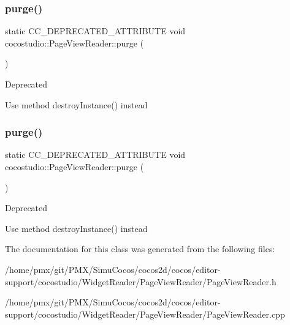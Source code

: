 \subsubsection{\texorpdfstring{purge()}{purge()}\hspace{0.1cm}{\footnotesize\ttfamily [1/2]}}
{\footnotesize\ttfamily static C\+C\+\_\+\+D\+E\+P\+R\+E\+C\+A\+T\+E\+D\+\_\+\+A\+T\+T\+R\+I\+B\+U\+TE void cocostudio\+::\+Page\+View\+Reader\+::purge (\begin{DoxyParamCaption}{ }\end{DoxyParamCaption})\hspace{0.3cm}{\ttfamily [static]}}

\begin{DoxyRefDesc}{Deprecated}
\item[\hyperlink{deprecated__deprecated000096}{Deprecated}]Use method destroy\+Instance() instead \end{DoxyRefDesc}
\mbox{\label{classcocostudio_1_1PageViewReader_ae5a951df9cd9cb44ef6aa152b2e971cc}} 
\subsubsection{\texorpdfstring{purge()}{purge()}\hspace{0.1cm}{\footnotesize\ttfamily [2/2]}}
{\footnotesize\ttfamily static C\+C\+\_\+\+D\+E\+P\+R\+E\+C\+A\+T\+E\+D\+\_\+\+A\+T\+T\+R\+I\+B\+U\+TE void cocostudio\+::\+Page\+View\+Reader\+::purge (\begin{DoxyParamCaption}{ }\end{DoxyParamCaption})\hspace{0.3cm}{\ttfamily [static]}}

\begin{DoxyRefDesc}{Deprecated}
\item[\hyperlink{deprecated__deprecated000331}{Deprecated}]Use method destroy\+Instance() instead \end{DoxyRefDesc}


The documentation for this class was generated from the following files\+:\begin{DoxyCompactItemize}
\item 
/home/pmx/git/\+P\+M\+X/\+Simu\+Cocos/cocos2d/cocos/editor-\/support/cocostudio/\+Widget\+Reader/\+Page\+View\+Reader/Page\+View\+Reader.\+h\item 
/home/pmx/git/\+P\+M\+X/\+Simu\+Cocos/cocos2d/cocos/editor-\/support/cocostudio/\+Widget\+Reader/\+Page\+View\+Reader/Page\+View\+Reader.\+cpp\end{DoxyCompactItemize}

